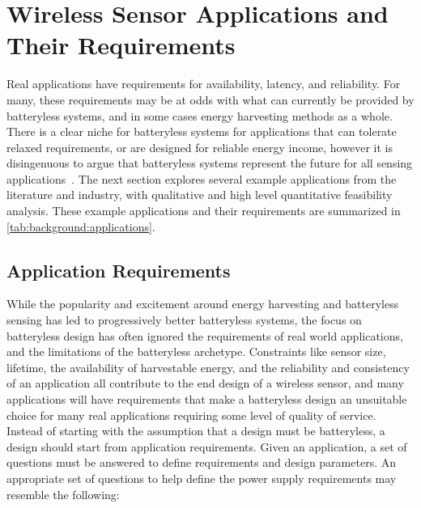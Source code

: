 \section{Wireless Sensor Applications and Their Requirements}
\label{sec:background:app}
Real applications have requirements for availability, latency, and reliability. For many, these requirements may be at odds with what can currently be provided by batteryless systems, and in some cases energy harvesting methods as a whole.
There is a clear niche for batteryless systems for applications that can tolerate relaxed requirements, or are designed for reliable energy income, however it is disingenuous to argue that batteryless systems represent the future for all sensing applications~\cite{hester2017future}.
The next section explores several example applications from the literature and industry, with qualitative and high level quantitative feasibility analysis.
These example applications and their requirements are summarized in \cref{tab:background:applications}.


\subsection{Application Requirements}
\label{sec:background:background_reqs}
While the popularity and excitement around energy harvesting and batteryless sensing has led to progressively better batteryless systems, the focus on batteryless design has often ignored the requirements of real world applications, and the limitations of the batteryless archetype.
Constraints like sensor size, lifetime, the availability of harvestable energy, and the reliability and consistency of an application all contribute to the end design of a wireless sensor, and many applications will have requirements that make a batteryless design an unsuitable choice for many real applications requiring some level of quality of service.
Instead of starting with the assumption that a design must be batteryless, a design should start from application requirements. Given an application, a set of questions must be answered to define requirements and design parameters.
An appropriate set of questions to help define the power supply requirements may resemble the following:

